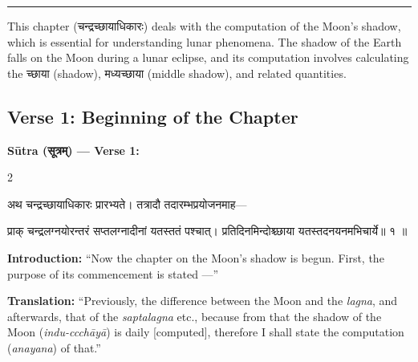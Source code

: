 \documentclass[11pt,a4paper]{article}
\newcommand{\dev}[1]{{\devanagarifont #1}}
\newenvironment{sanskritverse}{%
  \begin{center}\begin{minipage}{0.95\textwidth}
  \setlength{\leftskip}{1em}
  \setlength{\rightskip}{1em}
  \dev
}{\end{minipage}\end{center}}
\begin{document}
\begin{center}
\textcolor{rulecolor}{\rule{0.8\textwidth}{0.5pt}}
\end{center}

This chapter (\dev{चन्द्रच्छायाधिकारः}) deals with the computation of the Moon's shadow, which is essential for understanding lunar phenomena. The shadow of the Earth falls on the Moon during a lunar eclipse, and its computation involves calculating the \dev{च्छाया} (shadow), \dev{मध्यच्छाया} (middle shadow), and related quantities.

\subsection{Verse 1: Beginning of the Chapter}

\vspace{0.5em}
\noindent\textbf{Sūtra (\dev{सूत्रम्}) — Verse 1:}

\begin{paracol}{2}

\begin{sanskritverse}
अथ चन्द्रच्छायाधिकारः प्रारभ्यते। तत्रादौ तदारम्भप्रयोजनमाह—
\end{sanskritverse}

\begin{sanskritverse}
प्राक् चन्द्रलग्नयोरन्तरं सप्तलग्नादीनां यतस्ततं पश्चात्।
प्रतिदिनमिन्दोश्च्छाया यतस्तदनयनमभिचार्ये॥ १ ॥
\end{sanskritverse}

\switchcolumn

\textbf{Introduction:} ``Now the chapter on the Moon's shadow is begun. First, the purpose of its commencement is stated ---''

\textbf{Translation:} ``Previously, the difference between the Moon and the \textit{lagna}, and afterwards, that of the \textit{saptalagna} etc., because from that the shadow of the Moon (\textit{indu-ccchāyā}) is daily [computed], therefore I shall state the computation (\textit{anayana}) of that.''

\end{paracol}

\vspace{0.5em}
\end{document}
